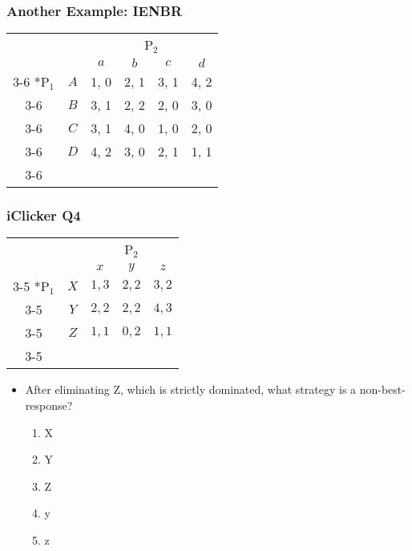 \begin{frame}
\frametitle{Another Example: IENBR}
\begin{table}[h]
\centering
\setlength{\extrarowheight}{2pt}
\begin{tabular}{cc|c|c|c|c|}
	& \multicolumn{1}{c}{} & \multicolumn{4}{c}{P$_2$}\\
	& \multicolumn{1}{c}{} & \multicolumn{1}{c}{$a$} & \multicolumn{1}{c}{$b$} & \multicolumn{1}{c}{$c$} & \multicolumn{1}{c}{$d$} \\\cline{3-6}
	\multirow{4}*{P$_1$}  & $A$ & 1, 0 & 2, 1 & 3, 1 & 4, 2 \\\cline{3-6}
	& $B$ & 3, 1 & 2, 2 & 2, 0 & 3, 0 \\\cline{3-6}
	& $C$ & 3, 1 & 4, 0 & 1, 0 & 2, 0 \\\cline{3-6}
	& $D$ & 4, 2 & 3, 0 & 2, 1 & 1, 1 \\\cline{3-6}
\end{tabular}
\end{table}
\end{frame}

\begin{frame}
\frametitle{iClicker Q4}
\begin{table}[h]
	\centering
	\setlength{\extrarowheight}{2pt}
	\begin{tabular}{cc|c|c|c|}
	& \multicolumn{1}{c}{} & \multicolumn{3}{c}{P$_2$}\\
	& \multicolumn{1}{c}{} & \multicolumn{1}{c}{$x$} & \multicolumn{1}{c}{$y$} & \multicolumn{1}{c}{$z$} \\\cline{3-5}
	\multirow{3}*{P$_1$}  & $X$ & $1,3$ & $2,2$ & $3,2$ \\\cline{3-5}
	& $Y$ & $2,2$ & $2,2$ & $4,3$\\\cline{3-5}
	& $Z$ & $1,1$ & $0,2$ & $1,1$\\\cline{3-5}
	\end{tabular}
\end{table}
\begin{itemize}
	\item After eliminating Z, which is strictly dominated, what strategy is a non-best-response?
	\begin{enumerate}[label=\Alph*)]
		\item X
		\item Y
		\item Z
		\item y
		\item z
	\end{enumerate}
\end{itemize}
\end{frame}

